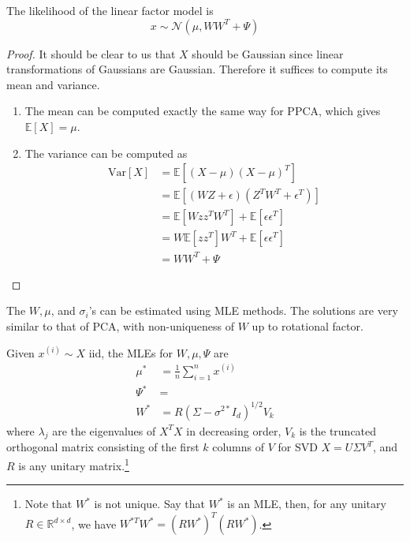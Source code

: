   \begin{lemma}
    The likelihood of the linear factor model is 
    \begin{equation}
      x \sim \mathcal{N}(\mu, W W^T + \Psi)
    \end{equation}
  \end{lemma}
  \begin{proof}
    It should be clear to us that $X$ should be Gaussian since linear transformations of Gaussians are Gaussian. Therefore it suffices to compute its mean and variance. 
    \begin{enumerate}
      \item The mean can be computed exactly the same way for PPCA, which gives $\mathbb{E}[X] = \mu$. 
      \item The variance can be computed as 
      \begin{align} 
        \mathrm{Var}[X] & = \mathbb{E}[ (X - \mu)(X - \mu)^T ] \\
                        & = \mathbb{E}[ (W Z + \epsilon) (Z^T W^T + \epsilon^T)] \\
                        & = \mathbb{E}[W z z^T W^T] + \mathbb{E}[ \epsilon \epsilon^T] \\
                        & = W \mathbb{E}[ z z^T] W^T + \mathbb{E}[ \epsilon \epsilon^T] \\
                        & = W W^T + \Psi
      \end{align} 
    \end{enumerate}
  \end{proof}

  The $W, \mu$, and $\sigma_i$'s can be estimated using MLE methods. The solutions are very similar to that of PCA, with non-uniqueness of $W$ up to rotational factor. 

  \begin{theorem}
    Given $x^{(i)} \sim X$ iid, the MLEs for $W, \mu, \Psi$ are 
    \begin{align}
      \mu^\ast & = \frac{1}{n} \sum_{i=1}^n x^{(i)} \\
      \Psi^\ast & = \\
      W^\ast & = R (\Sigma - \sigma^{2 \ast} I_d )^{1/2} V_k
    \end{align}
    where $\lambda_j$ are the eigenvalues of $X^T X$ in decreasing order, $V_k$ is the truncated orthogonal matrix consisting of the first $k$ columns of $V$ for SVD $X = U \Sigma V^T$, and $R$ is any unitary matrix.\footnote{Note that $W^{\ast}$ is not unique. Say that $W^\ast$ is an MLE, then, for any unitary $R \in \mathbb{R}^{d \times d}$, we have $W^{\ast T} W^\ast = (R W^\ast)^T (R W^\ast)$.} 
  \end{theorem}

